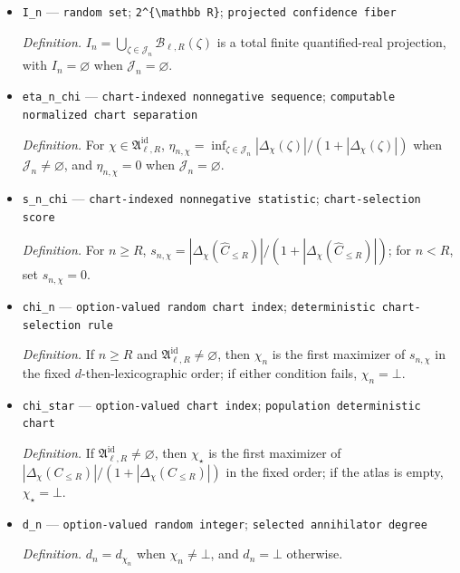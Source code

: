 \documentclass{article}
\begin{document}
\begin{itemize}
  \item \texttt{I\_\allowbreak{}n} --- \texttt{random set}; \texttt{2\textasciicircum{}\{\textbackslash{}\allowbreak{}mathbb R\}\allowbreak{}}; \texttt{projected confidence fiber}
  \par\smallskip\noindent\emph{Definition.} \(I_n=\bigcup_{\zeta\in\mathcal J_n}\mathcal B_{\ell,R}(\zeta)\) is a total finite quantified-real projection, with \(I_n=\varnothing\) when \(\mathcal J_n=\varnothing\).
  \item \texttt{eta\_\allowbreak{}n\_\allowbreak{}chi} --- \texttt{chart-\allowbreak{}indexed nonnegative sequence}; \texttt{computable normalized chart separation}
  \par\smallskip\noindent\emph{Definition.} For \(\chi\in\mathfrak A^{\mathrm{id}}_{\ell,R}\), \(\eta_{n,\chi}=\inf_{\zeta\in\mathcal J_n}|\Delta_{\chi}(\zeta)|/(1+|\Delta_{\chi}(\zeta)|)\) when \(\mathcal J_n\ne\varnothing\), and \(\eta_{n,\chi}=0\) when \(\mathcal J_n=\varnothing\).
  \item \texttt{s\_\allowbreak{}n\_\allowbreak{}chi} --- \texttt{chart-\allowbreak{}indexed nonnegative statistic}; \texttt{chart-\allowbreak{}selection score}
  \par\smallskip\noindent\emph{Definition.} For \(n\ge R\), \(s_{n,\chi}=|\Delta_{\chi}(\widehat C_{\le R})|/(1+|\Delta_{\chi}(\widehat C_{\le R})|)\); for \(n<R\), set \(s_{n,\chi}=0\).
  \item \texttt{chi\_\allowbreak{}n} --- \texttt{option-\allowbreak{}valued random chart index}; \texttt{deterministic chart-\allowbreak{}selection rule}
  \par\smallskip\noindent\emph{Definition.} If \(n\ge R\) and \(\mathfrak A^{\mathrm{id}}_{\ell,R}\ne\varnothing\), then \(\chi_n\) is the first maximizer of \(s_{n,\chi}\) in the fixed \(d\)-then-lexicographic order; if either condition fails, \(\chi_n=\bot\).
  \item \texttt{chi\_\allowbreak{}star} --- \texttt{option-\allowbreak{}valued chart index}; \texttt{population deterministic chart}
  \par\smallskip\noindent\emph{Definition.} If \(\mathfrak A^{\mathrm{id}}_{\ell,R}\ne\varnothing\), then \(\chi_{\star}\) is the first maximizer of \(|\Delta_{\chi}(C_{\le R})|/(1+|\Delta_{\chi}(C_{\le R})|)\) in the fixed order; if the atlas is empty, \(\chi_{\star}=\bot\).
  \item \texttt{d\_\allowbreak{}n} --- \texttt{option-\allowbreak{}valued random integer}; \texttt{selected annihilator degree}
  \par\smallskip\noindent\emph{Definition.} \(d_n=d_{\chi_n}\) when \(\chi_n\ne\bot\), and \(d_n=\bot\) otherwise.

\end{itemize}
\end{document}
